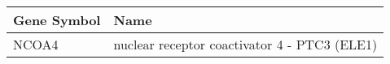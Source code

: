\begin{tabular}{ll}
\toprule
Gene Symbol &                                         Name \\
\midrule
      NCOA4 & nuclear receptor coactivator 4 - PTC3 (ELE1) \\
\bottomrule
\end{tabular}
